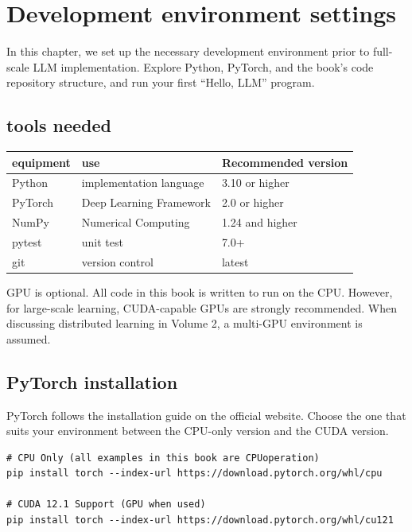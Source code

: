 \chapter{Development environment settings}
\label{ch:setup}

In this chapter, we set up the necessary development environment prior to full-scale LLM implementation. Explore Python, PyTorch, and the book's code repository structure, and run your first ``Hello, LLM'' program.

\section{tools needed}

\begin{center}
\begin{tabularx}{\textwidth}{lXl}
\toprule
\textbf{equipment}&\textbf{use}&\textbf{Recommended version}\\
\midrule
Python & implementation language & 3.10 or higher \\
PyTorch & Deep Learning Framework & 2.0 or higher \\
NumPy & Numerical Computing & 1.24 and higher \\
pytest & unit test & 7.0+ \\
git & version control & latest \\
\bottomrule
\end{tabularx}
\end{center}

GPU is optional. All code in this book is written to run on the CPU. However, for large-scale learning, CUDA-capable GPUs are strongly recommended. When discussing distributed learning in Volume 2, a multi-GPU environment is assumed.

\section{PyTorch installation}

PyTorch follows the installation guide on the official website. Choose the one that suits your environment between the CPU-only version and the CUDA version.

\begin{lstlisting}[style=bashstyle]
# CPU Only (all examples in this book are CPUoperation)
pip install torch --index-url https://download.pytorch.org/whl/cpu

# CUDA 12.1 Support (GPU when used)
pip install torch --index-url https://download.pytorch.org/whl/cu121
\end{lstlisting}

